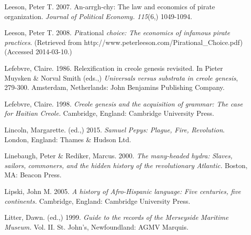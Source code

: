 \begin{styleStandard}
Leeson, Peter T. 2007. An-arrgh-chy: The law and economics of pirate organization. \textit{Journal of Political Economy. 115}(6,) 1049-1094.
\end{styleStandard}

\begin{styleStandard}
Leeson, Peter T. 2008. \textit{Pi}rational\textit{ choice: The economics of infamous pirate practices}. (Retrieved from http://www.peterleeson.com/Pirational\_Choice.pdf) (Accessed 2014-03-10.)
\end{styleStandard}

\begin{styleStandard}
Lefebvre, Claire. 1986. Relexification in creole genesis revisited. In Pieter Muysken \& Norval Smith (eds.,) \textit{Universals versus substrata in creole genesis}, 279-300. Amsterdam, Netherlands: John Benjamins Publishing Company.
\end{styleStandard}

\begin{styleStandard}
Lefebvre, Claire. 1998. \textit{Creole genesis and the acquisition of grammar: The case for Haitian Creole. }Cambridge, England: Cambridge University Press.
\end{styleStandard}

\begin{styleStandard}
Lincoln, Margarette. (ed.,) 2015. \textit{Samuel Pepys: Plague, Fire, Revolution}. London, England: Thames \& Hudson Ltd. 
\end{styleStandard}

\begin{styleStandard}
Linebaugh, Peter \& Rediker, Marcus. 2000. \textit{The many-headed hydra: Slaves, sailors,} \textit{commoners, and the hidden history of the revolutionary Atlantic.} Boston, MA: Beacon Press.
\end{styleStandard}

\begin{styleStandard}
Lipski, John M. 2005. \textit{A history of Afro-Hispanic language: Five centuries, five continents.} Cambridge, England: Cambridge University Press.
\end{styleStandard}

\begin{styleStandard}
Litter, Dawn. (ed.,) 1999. \textit{Guide to the records of the Merseyside Maritime Museum. }Vol. II. St. John’s, Newfoundland: AGMV Marquis. 
\end{styleStandard}

